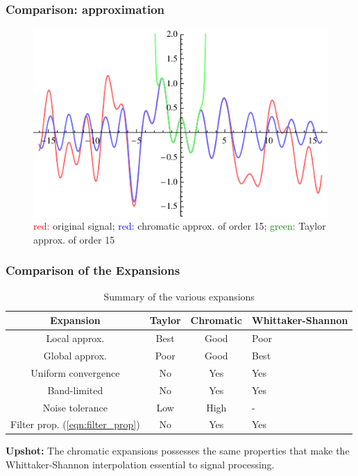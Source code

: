 \documentclass{beamer}
\begin{document}

\begin{frame}
\frametitle{Comparison: approximation}

\begin{figure} %
\centering
	\includegraphics[width=0.8\columnwidth]{../figures/approx}
\caption{\textcolor{red}{red:} original signal; 
\textcolor{blue}{red:} chromatic approx. of order 15;
\textcolor{green}{green:} Taylor approx. of order 15}
\end{figure}

\end{frame}


\begin{frame}
\frametitle{Comparison of the Expansions}

\begin{table}
\begin{tabular}{c c c p{2cm}}
\toprule
\textbf{Expansion} & Taylor & Chromatic & Whittaker-Shannon\\
\midrule
Local approx. & Best & Good & Poor \\
Global approx. & Poor & Good & Best \\
Uniform convergence & No & Yes & Yes \\
Band-limited & No & Yes & Yes \\
Noise tolerance & Low & High & - \\
Filter prop. (\ref{eqn:filter_prop}) & No & Yes & Yes \\
\bottomrule
\end{tabular}
\caption{Summary of the various expansions}
\end{table}

\textbf{Upshot:} The chromatic expansions possesses the same properties 
that make the Whittaker-Shannon interpolation essential to signal processing.


\end{frame}
\end{document}
